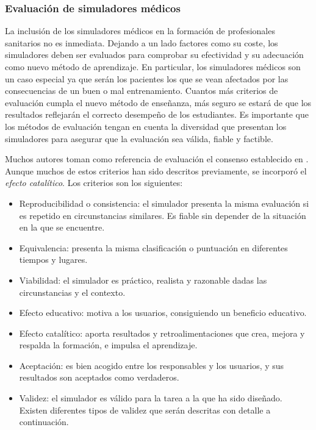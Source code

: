 



\subsubsection{Evaluación de simuladores médicos}
\label{art:evaluation}

La inclusión de los simuladores médicos en la formación de profesionales sanitarios no es inmediata. Dejando a un lado factores como su coste, los simuladores deben ser evaluados para comprobar su efectividad y su adecuación como nuevo método de aprendizaje. En particular, los simuladores médicos son un caso especial ya que serán los pacientes los que se vean afectados por las consecuencias de un buen o mal entrenamiento. Cuantos más criterios de evaluación cumpla el nuevo método de enseñanza, más seguro se estará de que los resultados reflejarán el correcto desempeño de los estudiantes.
Es importante que los métodos de evaluación tengan en cuenta la diversidad que presentan los simuladores para asegurar que la evaluación sea válida, fiable y factible. 

Muchos autores toman como referencia de evaluación el consenso establecido en  \cite{norcini2011criteria}. Aunque muchos de estos criterios han sido descritos previamente, se incorporó el  \emph{efecto catalítico}. Los criterios son los siguientes:

\begin{itemize}

\item Reproducibilidad o consistencia: el simulador presenta la misma evaluación si es repetido en circunstancias similares. Es fiable sin depender de la situación en la que se encuentre.
\item Equivalencia: presenta la misma clasificación o puntuación en diferentes tiempos y lugares.%
\item Viabilidad: el simulador es práctico, realista y razonable dadas las circunstancias y el contexto.
\item Efecto educativo: motiva a los usuarios, consiguiendo un beneficio educativo.
\item Efecto catalítico: aporta resultados y retroalimentaciones que crea, mejora y respalda la formación, e impulsa el aprendizaje.
\item Aceptación: es bien acogido entre los responsables y los usuarios, y sus resultados son aceptados como verdaderos.
\item Validez: el simulador es válido para la tarea a la que ha sido diseñado. Existen diferentes tipos de validez que serán descritas con detalle a continuación.
\end{itemize}




